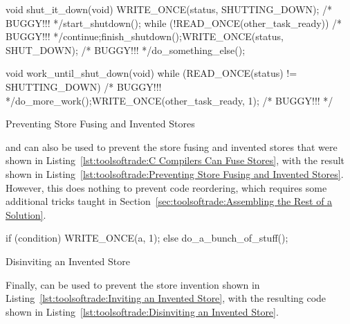 \begin{listing}[tbp]
\begin{fcvlabel}
\begin{VerbatimL}[commandchars=\\\[\]]
void shut_it_down(void)
{
	WRITE_ONCE(status, SHUTTING_DOWN); /* BUGGY!!! */\lnlbl[store:a]
	start_shutdown();
	while (!READ_ONCE(other_task_ready)) /* BUGGY!!! */\lnlbl[loop:b]
		continue;\lnlbl[loop:e]
	finish_shutdown();\lnlbl[finish]
	WRITE_ONCE(status, SHUT_DOWN); /* BUGGY!!! */\lnlbl[store:b]
	do_something_else();
}

void work_until_shut_down(void)
{
	while (READ_ONCE(status) != SHUTTING_DOWN) /* BUGGY!!! */
		do_more_work();
	WRITE_ONCE(other_task_ready, 1); /* BUGGY!!! */
}
\end{VerbatimL}
\end{fcvlabel}
\caption{Preventing Store Fusing and Invented Stores}
\label{lst:toolsoftrade:Preventing Store Fusing and Invented Stores}
\end{listing}

 and  can also be used to prevent the
store fusing and invented stores that were shown in
Listing~\ref{lst:toolsoftrade:C Compilers Can Fuse Stores},
with the result shown in
Listing~\ref{lst:toolsoftrade:Preventing Store Fusing and Invented Stores}.
However, this does nothing to prevent code reordering, which requires
some additional tricks taught in
Section~\ref{sec:toolsoftrade:Assembling the Rest of a Solution}.

\begin{listing}[tbp]
\begin{fcvlabel}
\begin{VerbatimL}[commandchars=\\\{\}]
if (condition)
	WRITE_ONCE(a, 1);
else
	do_a_bunch_of_stuff();
\end{VerbatimL}
\end{fcvlabel}
\caption{Disinviting an Invented Store}
\label{lst:toolsoftrade:Disinviting an Invented Store}
\end{listing}

Finally,  can be used to prevent the store invention
shown in
Listing~\ref{lst:toolsoftrade:Inviting an Invented Store},
with the resulting code shown in
Listing~\ref{lst:toolsoftrade:Disinviting an Invented Store}.

